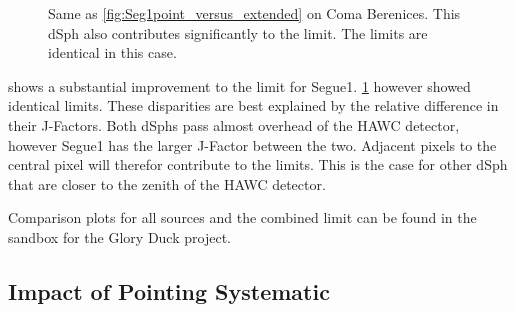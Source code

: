 \begin{figure}[h]
    \caption{Same as \cref{fig:Seg1point_versus_extended} on Coma Berenices. This dSph also contributes significantly to the limit. The limits are identical in this case.}
\label{fig:ComaBpoint_versus_extended}
\end{figure}

 shows a substantial improvement to the limit for Segue1.
\cref{fig:ComaBpoint_versus_extended} however showed identical limits.
These disparities are best explained by the relative difference in their J-Factors.
Both dSphs pass almost overhead of the HAWC detector, however Segue1 has the larger J-Factor between the two.
Adjacent pixels to the central pixel will therefor contribute to the limits.
This is the case for other dSph that are closer to the zenith of the HAWC detector.

Comparison plots for all sources and the combined limit can be found in the sandbox for the Glory Duck project.

\subsection{Impact of Pointing Systematic}\label{sec:gd_pointing_sys}

